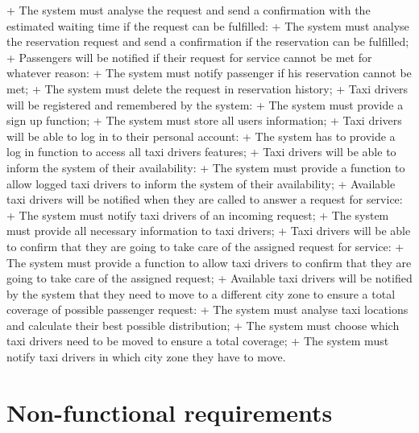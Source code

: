 	+ The system must analyse the request and send a confirmation with the estimated waiting time if the request can be fulfilled:
	+ The system must analyse the reservation request and send a confirmation if the reservation can be fulfilled;
+ Passengers will be notified if their request for service cannot be met for whatever reason:
	+ The system must notify passenger if his reservation cannot be met;
	+ The system must delete the request in reservation history;
+ Taxi drivers will be registered and remembered by the system:
	+ The system must provide a sign up function;
	+ The system must store all users information; 
+ Taxi drivers will be able to log in to their personal account:
	+ The system has to provide a log in function to access all taxi drivers features;
+ Taxi drivers will be able to inform the system of their availability:
	+ The system must provide a function to allow logged taxi drivers to inform the system of their availability;
+ Available taxi drivers will be notified when they are called to answer a request for service:
	+ The system must notify taxi drivers of an incoming request;
	+ The system must provide all necessary information to taxi drivers;
+ Taxi drivers will be able to confirm that they are going to take care of the assigned request for service:
	+ The system must provide a function to allow taxi drivers to confirm that they are going to take care of the assigned request;
+ Available taxi drivers will be notified by the system that they need to move to a different city zone to ensure a total coverage of possible passenger request:
	+ The system must analyse taxi locations and calculate their best possible distribution;
	+ The system must choose which taxi drivers need to be moved to ensure a total coverage;
	+ The system must notify taxi drivers in which city zone they have to move.

\section{Non-functional requirements}

